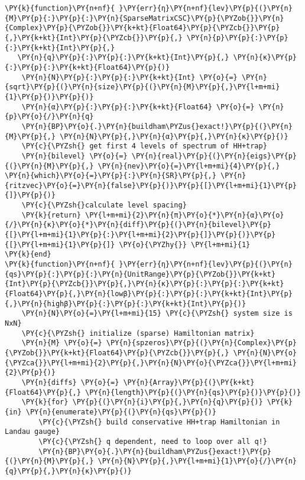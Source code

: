 \begin{Verbatim}[commandchars=\\\{\}]
\PY{k}{function}\PY{n+nf}{ }\PY{err}{η}\PY{n+nf}{lev}\PY{p}{(}\PY{n}{M}\PY{p}{:}\PY{p}{:}\PY{n}{SparseMatrixCSC}\PY{p}{\PYZob{}}\PY{n}{Complex}\PY{p}{\PYZob{}}\PY{k+kt}{Float64}\PY{p}{\PYZcb{}}\PY{p}{,}\PY{k+kt}{Int}\PY{p}{\PYZcb{}}\PY{p}{,} \PY{n}{p}\PY{p}{:}\PY{p}{:}\PY{k+kt}{Int}\PY{p}{,}
   \PY{n}{q}\PY{p}{:}\PY{p}{:}\PY{k+kt}{Int}\PY{p}{,} \PY{n}{κ}\PY{p}{:}\PY{p}{:}\PY{k+kt}{Float64}\PY{p}{)}
    \PY{n}{N}\PY{p}{:}\PY{p}{:}\PY{k+kt}{Int} \PY{o}{=} \PY{n}{sqrt}\PY{p}{(}\PY{n}{size}\PY{p}{(}\PY{n}{M}\PY{p}{,}\PY{l+m+mi}{1}\PY{p}{)}\PY{p}{)}
    \PY{n}{α}\PY{p}{:}\PY{p}{:}\PY{k+kt}{Float64} \PY{o}{=} \PY{n}{p}\PY{o}{/}\PY{n}{q}
    \PY{n}{BP}\PY{o}{.}\PY{n}{buildham\PYZus{}exact!}\PY{p}{(}\PY{n}{M}\PY{p}{,} \PY{n}{N}\PY{p}{,}\PY{n}{α}\PY{p}{,}\PY{n}{κ}\PY{p}{)}
    \PY{c}{\PYZsh{} get first 4 levels of spectrum of HH+trap}
    \PY{n}{bilevel} \PY{o}{=} \PY{n}{real}\PY{p}{(}\PY{n}{eigs}\PY{p}{(}\PY{n}{M}\PY{p}{,} \PY{n}{nev}\PY{o}{=}\PY{l+m+mi}{4}\PY{p}{,} \PY{n}{which}\PY{o}{=}\PY{p}{:}\PY{n}{SR}\PY{p}{,} \PY{n}{ritzvec}\PY{o}{=}\PY{n}{false}\PY{p}{)}\PY{p}{[}\PY{l+m+mi}{1}\PY{p}{]}\PY{p}{)}
    \PY{c}{\PYZsh{}calculate level spacing}
    \PY{k}{return} \PY{l+m+mi}{2}\PY{n}{π}\PY{o}{*}\PY{n}{α}\PY{o}{/}\PY{n}{κ}\PY{o}{*}\PY{n}{diff}\PY{p}{(}\PY{n}{bilevel}\PY{p}{[}\PY{l+m+mi}{1}\PY{p}{:}\PY{l+m+mi}{2}\PY{p}{]}\PY{p}{)}\PY{p}{[}\PY{l+m+mi}{1}\PY{p}{]} \PY{o}{\PYZhy{}} \PY{l+m+mi}{1}
\PY{k}{end}
\PY{k}{function}\PY{n+nf}{ }\PY{err}{η}\PY{n+nf}{lev}\PY{p}{(}\PY{n}{qs}\PY{p}{:}\PY{p}{:}\PY{n}{UnitRange}\PY{p}{\PYZob{}}\PY{k+kt}{Int}\PY{p}{\PYZcb{}}\PY{p}{,}\PY{n}{κ}\PY{p}{:}\PY{p}{:}\PY{k+kt}{Float64}\PY{p}{,}\PY{n}{lowβ}\PY{p}{:}\PY{p}{:}\PY{k+kt}{Int}\PY{p}{,}\PY{n}{highβ}\PY{p}{:}\PY{p}{:}\PY{k+kt}{Int}\PY{p}{)}
    \PY{n}{N}\PY{o}{=}\PY{l+m+mi}{15} \PY{c}{\PYZsh{} system size is NxN}
    \PY{c}{\PYZsh{} initialize (sparse) Hamiltonian matrix}
    \PY{n}{M} \PY{o}{=} \PY{n}{spzeros}\PY{p}{(}\PY{n}{Complex}\PY{p}{\PYZob{}}\PY{k+kt}{Float64}\PY{p}{\PYZcb{}}\PY{p}{,} \PY{n}{N}\PY{o}{\PYZca{}}\PY{l+m+mi}{2}\PY{p}{,}\PY{n}{N}\PY{o}{\PYZca{}}\PY{l+m+mi}{2}\PY{p}{)}
    \PY{n}{diffs} \PY{o}{=} \PY{n}{Array}\PY{p}{(}\PY{k+kt}{Float64}\PY{p}{,} \PY{n}{length}\PY{p}{(}\PY{n}{qs}\PY{p}{)}\PY{p}{)}
    \PY{k}{for} \PY{p}{(}\PY{n}{i}\PY{p}{,}\PY{n}{q}\PY{p}{)} \PY{k}{in} \PY{n}{enumerate}\PY{p}{(}\PY{n}{qs}\PY{p}{)}
        \PY{c}{\PYZsh{} build conservative HH+trap Hamiltonian in Landau gauge}
        \PY{c}{\PYZsh{} q dependent, need to loop over all q!}
        \PY{n}{BP}\PY{o}{.}\PY{n}{buildham\PYZus{}exact!}\PY{p}{(}\PY{n}{M}\PY{p}{,} \PY{n}{N}\PY{p}{,}\PY{l+m+mi}{1}\PY{o}{/}\PY{n}{q}\PY{p}{,}\PY{n}{κ}\PY{p}{)}

\end{Verbatim}

